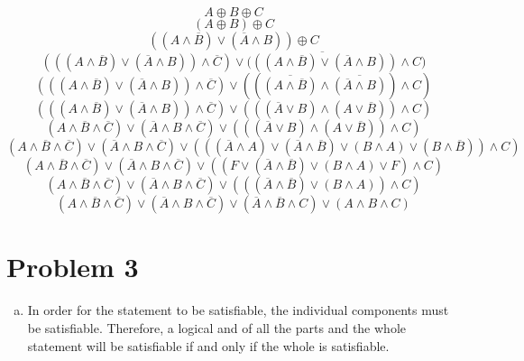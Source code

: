 \documentclass{article}
\begin{document}
$$ A \oplus B \oplus C $$
$$ (A \oplus B) \oplus C $$
$$ ((A \land \overline{B}) \lor (\overline{A} \land B)) \oplus C $$
$$ (((A \land \overline{B}) \lor (\overline{A} \land B)) \land \overline{C})
\lor \overline{(((A \land \overline{B}) \lor (\overline{A} \land B))} \land C) $$
$$ (((A \land \overline{B}) \lor (\overline{A} \land B)) \land \overline{C})
\lor ((\overline{(A \land \overline{B})} \land \overline{(\overline{A} \land B)}) \land C)  $$
$$ (((A \land \overline{B}) \lor (\overline{A} \land B)) \land \overline{C})
\lor (((\overline{A} \lor B) \land (A \lor \overline{B})) \land C) $$
$$ (A \land \overline{B} \land \overline{C}) \lor (\overline{A} \land B \land
\overline{C}) \lor (((\overline{A} \lor B) \land (A \lor \overline{B})) \land C) $$
$$ (A \land \overline{B} \land \overline{C}) \lor (\overline{A} \land B \land
\overline{C}) \lor (((\overline{A} \land A) \lor (\overline{A} \land
\overline{B}) \lor (B \land A) \lor (B \land \overline{B})) \land C) $$
$$ (A \land \overline{B} \land \overline{C}) \lor (\overline{A} \land B \land
\overline{C}) \lor ((F \lor (\overline{A} \land \overline{B}) \lor (B \land A)
\lor F) \land C)$$
$$ (A \land \overline{B} \land \overline{C}) \lor (\overline{A} \land B \land
\overline{C}) \lor (((\overline{A} \land \overline{B}) \lor (B \land A)) \land C) $$
$$ (A \land \overline{B} \land \overline{C}) \lor (\overline{A} \land B \land
\overline{C}) \lor (\overline{A} \land \overline{B} \land C) \lor (A \land B
\land C) $$

\section*{Problem 3}

\begin{enumerate}[a.]
  \item In order for the statement to be satisfiable, the individual components
    must be satisfiable. Therefore, a logical and of all the parts and the whole
    statement will be satisfiable if and only if the whole is satisfiable.
\end{enumerate}
\end{document}
